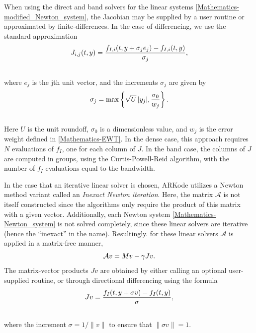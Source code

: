 \documentclass[letterpaper,10pt,english]{sphinxmanual}
\begin{document}
When using the direct and band solvers for the linear systems
\eqref{Mathematics-modified_Newton_system}, the Jacobian may be supplied by a user
routine or approximated by finite-differences.  In the case of
differencing, we use the standard approximation
\begin{gather}
\begin{split}J_{i,j}(t,y) = \frac{f_{I,i}(t,y+\sigma_j e_j) - f_{I,i}(t,y)}{\sigma_j},\end{split}\notag\\\begin{split}\end{split}\notag
\end{gather}
where $e_j$ is the jth unit vector, and the increments
$\sigma_j$ are given by
\begin{gather}
\begin{split}\sigma_j = \max\left\{ \sqrt{U}\, |y_j|, \frac{\sigma_0}{w_j} \right\}.\end{split}\notag\\\begin{split}\end{split}\notag
\end{gather}
Here $U$ is the unit roundoff, $\sigma_0$ is a
dimensionless value, and $w_j$ is the error weight defined in
\eqref{Mathematics-EWT}.  In the dense case, this approach requires $N$
evaluations of $f_I$, one for each column of $J$.  In the
band case, the columns of $J$ are computed in groups, using the
Curtis-Powell-Reid algorithm, with the number of $f_I$
evaluations equal to the bandwidth.

In the case that an iterative linear solver is chosen, ARKode utilizes a
Newton method variant called an \emph{Inexact Newton iteration}.  Here, the
matrix ${\mathcal A}$ is not itself constructed since the
algorithms only require the product of this matrix with a given
vector.  Additionally, each Newton system \eqref{Mathematics-Newton_system} is not
solved completely, since these linear solvers are iterative (hence the
``inexact'' in the name). Resultingly. for these linear solvers
${\mathcal A}$ is applied in a matrix-free manner,
\begin{gather}
\begin{split}{\mathcal A}v = Mv - \gamma Jv.\end{split}\notag
\end{gather}
The matrix-vector products $Jv$ are obtained by either calling
an optional user-supplied routine, or through directional differencing
using the formula
\begin{gather}
\begin{split}Jv = \frac{f_I(t,y+\sigma v) - f_I(t,y)}{\sigma},\end{split}\notag\\\begin{split}\end{split}\notag
\end{gather}
where the increment $\sigma = 1/\|v\|$ to ensure that
$\|\sigma v\| = 1$.
\end{document}
